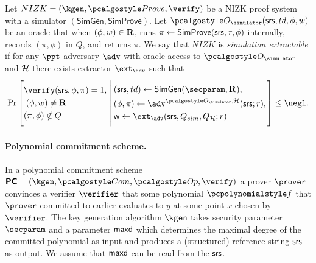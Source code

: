 \documentclass[runningheads,11pt]{llncs}
\begin{document}
\begin{definition}
  \label{def:sepcom}
  Let $NIZK = (\kgen, \prove, \verify)$ be a NIZK proof system
  with a simulator $(\mathsf{SimGen}, \mathsf{SimProve})$.
  Let $\oracles(\srs,td,\phi,w)$ be an oracle that when $(\phi,w)\in \mathbf{R}$, runs $\pi \gets \mathsf{SimProve(\mathsf{srs},\tau,\phi)}$ internally, records $(\pi,\phi)$ in $Q$, and returns $\pi$.
  We say that $NIZK$ is \emph{simulation extractable} if for any $\ppt$
  adversary $\adv$ with oracle access to $\oracles$ and $\mathcal{H}$ there exists extractor
  $\ext_{\adv}$ such that
\[
  \Pr \left[
    \begin{aligned}
      & \verify(\srs, \phi, \pi) = 1, \\
      & \;(\phi,w) \neq \REL\\
      & (\pi,\phi) \notin Q
    \end{aligned}
    \,\left|\,
      \vphantom{
        \begin{aligned}
          & \\
          & \\
          & \\
          &
        \end{aligned}
        }
    \begin{aligned}
      & (\srs, td) \gets \mathsf{SimGen}(\secparam, \REL),\\
      & (\phi, \pi) \gets \adv^{\oracles,\ro}(\srs; r), \\
      & \wit \gets \ext_\adv(\srs, Q_{sim}, Q_{\ro}; r)
    \end{aligned}
  \right.\right]
  \leq \negl.
\]
\end{definition}

\paragraph{Polynomial commitment scheme.}
\label{sec:poly_com}
In a polynomial commitment scheme $\PCOM = (\kgen, \com, \open, \verify)$ a
prover $\prover$ convinces a verifier $\verifier$ that some polynomial $\p{f}$
that $\prover$ committed to earlier evaluates to $y$ at some point $x$ chosen by
$\verifier$. The key generation algorithm $\kgen$ takes security
parameter $\secparam$ and a parameter $\mathsf{maxd}$ which determines the maximal
degree of the committed polynomial as input and produces a (structured) reference string $\mathsf{srs}$ as output. We assume that $\mathsf{maxd}$ can be read from
the $\mathsf{srs}$.
  
\end{document}
